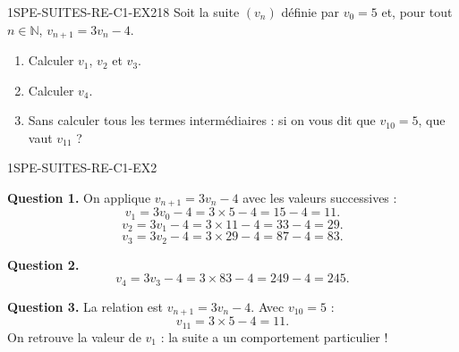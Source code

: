 
\begin{exercice}{1SPE-SUITES-RE-C1-EX2}{1}{8}
Soit la suite $(v_n)$ définie par $v_0 = 5$ et, pour tout $n \in \mathbb{N}$, $v_{n+1} = 3v_n - 4$.
\begin{enumerate}
  \item Calculer $v_1$, $v_2$ et $v_3$.
  \item Calculer $v_4$.
  \item Sans calculer tous les termes intermédiaires : si on vous dit que $v_{10} = 5$, que vaut $v_{11}$ ?
\end{enumerate}
\end{exercice}



\begin{corrige}{1SPE-SUITES-RE-C1-EX2}


\textbf{Question 1.} On applique $v_{n+1} = 3v_n - 4$ avec les valeurs successives :
\[
v_1 = 3v_0 - 4 = 3 \times 5 - 4 = 15 - 4 = 11.
\]
\[
v_2 = 3v_1 - 4 = 3 \times 11 - 4 = 33 - 4 = 29.
\]
\[
v_3 = 3v_2 - 4 = 3 \times 29 - 4 = 87 - 4 = 83.
\]

\textbf{Question 2.}
\[
v_4 = 3v_3 - 4 = 3 \times 83 - 4 = 249 - 4 = 245.
\]


\textbf{Question 3.} La relation est $v_{n+1} = 3v_n - 4$. Avec $v_{10} = 5$ :
\[
v_{11} = 3 \times 5 - 4 = 11.
\]
On retrouve la valeur de $v_1$ : la suite a un comportement particulier !

\end{corrige}


